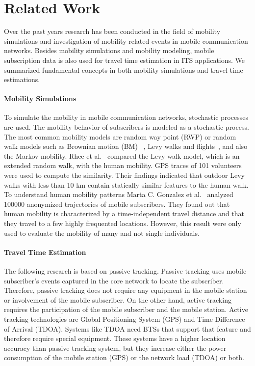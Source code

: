 \documentclass[twocolumn]{bmcart}%
\begin{document}
\section*{Related Work}
Over the past years research has been conducted in the field of mobility simulations and investigation of mobility related events in mobile communication networks. Besides mobility simulations and mobility modeling, mobile subscription data is also used for travel time estimation in ITS applications. We summarized fundamental concepts in both mobility simulations and travel time estimations.
\paragraph*{Mobility Simulations}
To simulate the mobility in mobile communication networks, stochastic processes are used. The mobility behavior of subscribers is modeled as a stochastic process. The most common mobility models are random way point (RWP) or random walk models such as Brownian motion (BM)~\cite{Klafter1996} , Levy walks and flights~\cite{Camp2002}, and also the Markov mobility\cite{Bai2004}.
Rhee et al.~\cite{Rhee2011} compared the Levy walk model, which is an extended random walk, with the human mobility. GPS traces of 101 volunteers were used to compute the similarity. Their findings indicated that outdoor Levy walks with less than 10 km contain statically similar features to the human walk.
To understand human mobility patterns Marta C. Gonzalez et al.~\cite{Gonzalez2008} analyzed 100000 anonymized trajectories of mobile subscribers. They found out that human mobility is characterized by a time-independent travel distance and that they travel to a few highly frequented locations. However, this result were only used to evaluate the mobility of many and not single individuals.
\paragraph*{Travel Time Estimation}
The following research is based on passive tracking. Passive tracking uses mobile subscriber's events captured in the core network to locate the subscriber. Therefore, passive tracking does not require any equipment in the mobile station or involvement of the mobile subscriber. On the other hand, active tracking requires the participation of the mobile subscriber and the mobile station. Active tracking technologies are Global Positioning System (GPS) and Time Difference of Arrival (TDOA). Systems like TDOA need BTSs that support that feature and therefore require special equipment. These systems have a higher location accuracy than passive tracking system, but they increase either the power consumption of the mobile station (GPS) or the network load (TDOA) or both.\newline
\end{document}
